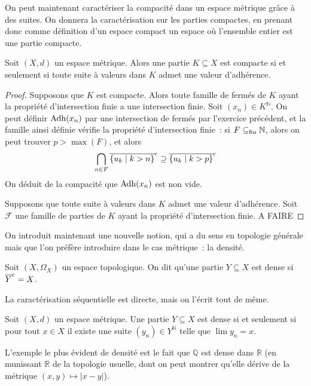 On peut maintenant caractériser la compacité dans un espace métrique grâce à des
suites. On donnera la caractérisation sur les parties compactes, en prenant donc
comme définition d'un espace compact un espace où l'ensemble entier est une
partie compacte.

\begin{theorem}
  Soit $(X,d)$ un espace métrique. Alors une partie $K\subseteq X$ est compacte
  si et seulement si toute suite à valeurs dans $K$ admet une valeur
  d'adhérence.
\end{theorem}

\begin{proof}
  Supposons que $K$ est compacte. Alors toute famille de fermés de $K$ ayant
  la propriété d'intersection finie a une intersection finie. Soit
  $(x_n)\in K^{\mathbb N}$. On peut définir
  $\operatorname{Adh}(x_n)$ par une intersection de fermés par l'exercice précédent, et
  la famille ainsi définie vérifie la propriété d'intersection finie~: si
  $F\subseteq_{\mathrm{fin}} \mathbb N$, alors on peut trouver $p > \max(F)$, et alors
  \[\bigcap_{n \in F}\overline{\{u_k\mid k > n\}}^{\mathrm c} \supseteq
  \overline{\{u_k\mid k > p\}}^{\mathrm c}\]
  On déduit de la compacité que $\operatorname{Adh}(x_n)$ est non vide.

  Supposons que toute suite à valeurs dans $K$ admet une valeur d'adhérence.
  Soit $\mathcal F$ une famille de parties de $K$ ayant la propriété
  d'intersection finie. A FAIRE
\end{proof}

On introduit maintenant une nouvelle notion, qui a du sens en topologie générale
mais que l'on préfère introduire dans le cas métrique~: la densité.

\begin{definition}[Densité]
  Soit $(X,\Omega_X)$ un espace topologique. On dit qu'une partie
  $Y\subseteq X$ est dense si $\overline{Y}^{\mathrm c} = X$.
\end{definition}

La caractérisation séquentielle est directe, mais on l'écrit tout de même.

\begin{property}
  Soit $(X,d)$ un espace métrique. Une partie $Y\subseteq X$ est dense si et
  seulement si pour tout $x\in X$ il existe une suite $(y_n)\in Y^\mathbb N$
  telle que $\lim y_n = x$.
\end{property}

\begin{example}
  L'exemple le plus évident de densité est le fait que $\mathbb Q$ est dense
  dans $\mathbb R$ (en munissant $\mathbb R$ de la topologie usuelle, dont on
  peut montrer qu'elle dérive de la métrique $(x,y)\mapsto |x-y|$).
\end{example}

